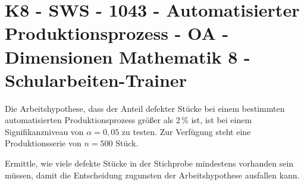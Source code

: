 \section{K8 - SWS - 1043 - Automatisierter Produktionsprozess - OA - Dimensionen Mathematik 8 - Schularbeiten-Trainer}

\begin{beispiel}[K8 - SWS]{1}
Die Arbeitshypothese, dass der Anteil defekter Stücke bei einem bestimmten automatisierten Produktionsprozess größer als $2\,\%$ ist, ist bei einem Signifikanzniveau von $\alpha=0,05$ zu testen. Zur Verfügung steht eine Produktionsserie von $n=500$ Stück.

Ermittle, wie viele defekte Stücke in der Stichprobe mindestens vorhanden sein müssen, damit die Entscheidung zugunsten der Arbeitshypothese ausfallen kann.

\end{beispiel}